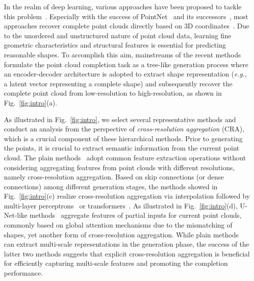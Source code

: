 \documentclass[letterpaper]{article} %
\begin{document}
In the realm of deep learning, various approaches have been proposed to tackle this problem~\cite{yang2018foldingnet, choy20163d, girdhar2016learning, xie2020grnet}.
Especially with the success of PointNet~\cite{qi2017pointnet} and its successors~\cite{qi2017pointnet++,wang2019dynamic,zhao2021point}, most approaches recover complete point clouds directly based on  3D coordinates~\cite{yuan2018pcn, wen2020point, wen2021pmp, tchapmi2019topnet, yu2021pointr, wang2020cascaded}.
Due to the unordered and unstructured nature of point cloud data, learning fine geometric characteristics and structural features is essential for predicting reasonable shapes.
To accomplish this aim, mainstreams of the recent methods~\cite{xiang2021snowflakenet, zhou2022seedformer, huang2020pf, yan2022fbnet, huang2020pf, tang2022lake, wang2022learning} formulate the point cloud completion task as a tree-like generation process where an encoder-decoder architecture is  adopted to extract shape representation ({\em e.g.}, a latent vector representing a complete shape) and subsequently recover the complete point cloud from low-resolution to high-resolution, as shown in Fig.~\ref{fig:intro}(a).

As illustrated in Fig.~\ref{fig:intro},  we select several representative methods and conduct an analysis from the perspective of {\em cross-resolution aggregation} (CRA), which is a crucial component of these hierarchical methods.
Prior to generating the points, it is crucial to extract semantic information from the current point cloud.
The plain methods~\cite{yuan2018pcn, huang2020pf} adopt common feature extraction operations without considering aggregating features from point clouds with different resolutions, namely cross-resolution aggregation.
Based on skip connections (or dense connections) among different generation stages, the methods showed in Fig.~\ref{fig:intro}(c) realize cross-resolution aggregation via interpolation followed by multi-layer perceptrons~\cite{yifan2019patch} or transformers~\cite{yan2022fbnet,  zhou2022seedformer}.
As illustrated in Fig.~\ref{fig:intro}(d), U-Net-like methods~\cite{wen2020point, yu2021pointr} aggregate  features of partial inputs for current point clouds, commonly based on global attention mechanisms due to the mismatching of shapes, yet another form of cross-resolution aggregation.
While plain methods can extract multi-scale representations in the generation phase, the success of  the latter two methods suggests that explicit cross-resolution aggregation is beneficial for efficiently capturing multi-scale features and  promoting the completion performance.
\end{document}
